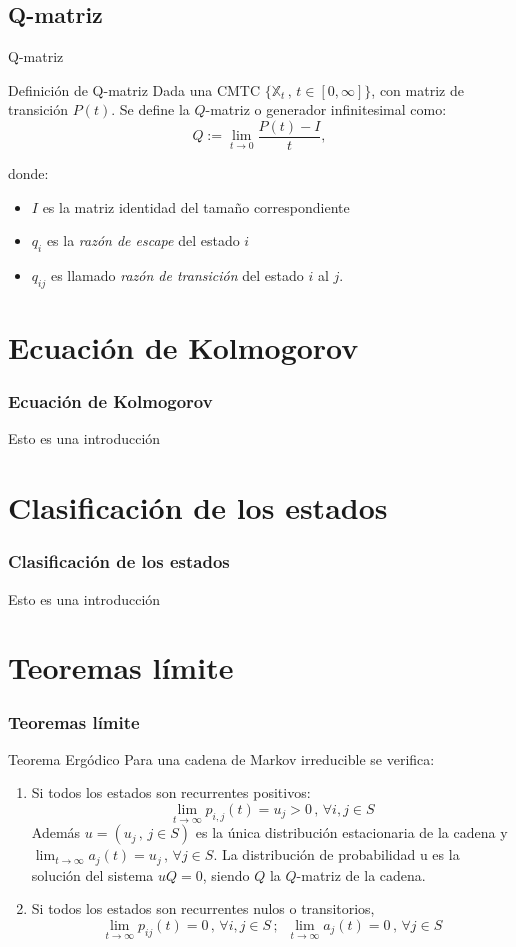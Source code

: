 \documentclass{beamer}
\begin{document}
\subsection{Q-matriz}
\begin{frame}{Q-matriz}
\begin{block}{Definición de Q-matriz}
Dada una CMTC $\{\mathbb{X}_t \, , \, t\in [0,\infty]\}$, con matriz de transición $P(t)$. Se define la $Q$-matriz o generador infinitesimal como:
$$Q:=\lim_{t \to 0}\dfrac{P(t)-I}{t},$$
\end{block}
donde:
\begin{itemize}
\item $I$ es la matriz identidad del tamaño correspondiente
\item  $q_i$ es la \textit{razón de escape} del estado $i$
\item $q_{ij}$ es llamado \textit{razón de transición} del estado $i$ al $j$.
\end{itemize}
\end{frame}
\section{Ecuación de Kolmogorov}
\begin{frame}
    \frametitle{Ecuación de Kolmogorov}
    Esto es una introducción
\end{frame}

\section{Clasificación de los estados}
\begin{frame}
    \frametitle{Clasificación de los estados}
    Esto es una introducción
\end{frame}

\section{Teoremas límite}
\begin{frame}
    \frametitle{Teoremas límite}
    \begin{block}{Teorema Ergódico}
    Para una cadena de Markov irreducible se verifica:
	\begin{enumerate}
    \item Si todos los estados son recurrentes positivos:
$$\lim_{t\rightarrow\infty}p_{i,j}(t)=u_j>0 \, , \, \forall i,j\in S$$
Además $u=(u_j \, , \, j\in S)$ es la única distribución estacionaria de la cadena y $\displaystyle\lim_{t\rightarrow\infty}a_j (t)=u_j \, , \, \forall j\in S$. La distribución de probabilidad u es la solución del sistema $uQ=0$, siendo $Q$ la $Q$-matriz de la cadena.
\item Si todos los estados son recurrentes nulos o transitorios,
$$\lim_{t\rightarrow\infty}p_{ij}(t)=0\, , \, \forall i,j \in S\, ;\,\,\, \lim_{t\rightarrow\infty}a_j (t)=0\, , \, \forall j\in S$$
\end{enumerate}
    \end{block}
\end{frame}
\end{document}
